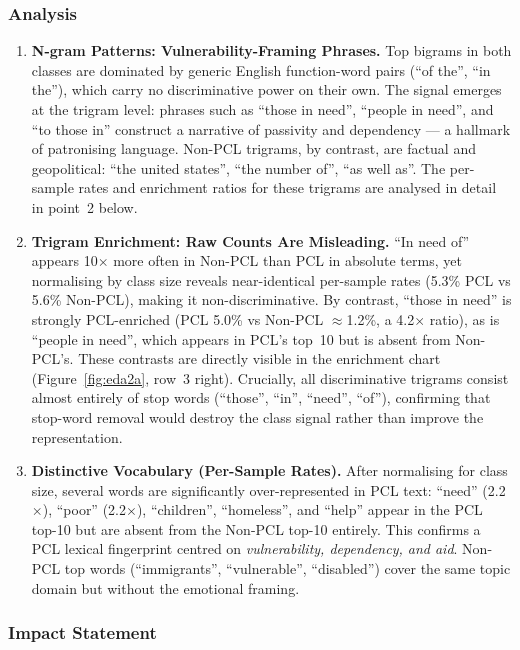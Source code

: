 \documentclass[11pt,a4paper]{article}
\begin{document}
\subsubsection{Analysis}

\begin{enumerate}[noitemsep]
    \item \textbf{N-gram Patterns: Vulnerability-Framing Phrases.} Top bigrams in both classes are dominated by generic English function-word pairs (``of the'', ``in the''), which carry no discriminative power on their own. The signal emerges at the trigram level: phrases such as ``those in need'', ``people in need'', and ``to those in'' construct a narrative of passivity and dependency — a hallmark of patronising language. Non-PCL trigrams, by contrast, are factual and geopolitical: ``the united states'', ``the number of'', ``as well as''. The per-sample rates and enrichment ratios for these trigrams are analysed in detail in point~2 below.

    \item \textbf{Trigram Enrichment: Raw Counts Are Misleading.} ``In need of'' appears 10$\times$ more often in Non-PCL than PCL in absolute terms, yet normalising by class size reveals near-identical per-sample rates (5.3\% PCL vs 5.6\% Non-PCL), making it non-discriminative. By contrast, ``those in need'' is strongly PCL-enriched (PCL 5.0\% vs Non-PCL $\approx$1.2\%, a 4.2$\times$ ratio), as is ``people in need'', which appears in PCL's top~10 but is absent from Non-PCL's. These contrasts are directly visible in the enrichment chart (Figure~\ref{fig:eda2a}, row~3 right). Crucially, all discriminative trigrams consist almost entirely of stop words (``those'', ``in'', ``need'', ``of''), confirming that stop-word removal would destroy the class signal rather than improve the representation.

    \item \textbf{Distinctive Vocabulary (Per-Sample Rates).} After normalising for class size, several words are significantly over-represented in PCL text: ``need'' (2.2$\times$), ``poor'' (2.2$\times$), ``children'', ``homeless'', and ``help'' appear in the PCL top-10 but are absent from the Non-PCL top-10 entirely. This confirms a PCL lexical fingerprint centred on \textit{vulnerability, dependency, and aid}. Non-PCL top words (``immigrants'', ``vulnerable'', ``disabled'') cover the same topic domain but without the emotional framing.
\end{enumerate}

\subsubsection{Impact Statement}
\end{document}

